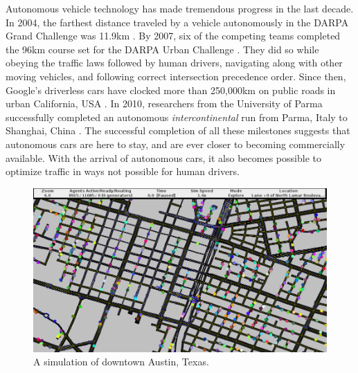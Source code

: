 \documentclass[letterpaper, 10 pt, conference]{ieeeconf}  %
\begin{document}
Autonomous vehicle technology has made tremendous progress in the last decade.
In 2004, the farthest distance traveled by a vehicle autonomously in the DARPA
Grand Challenge was 11.9km \cite{cnnGrandChallenge2004}. By 2007, six of the
competing teams completed the 96km course set for the DARPA Urban Challenge
\cite{spectrumUrbanChallenge2007}. They did so while obeying the traffic laws
followed by human drivers, navigating along with other moving vehicles, and
following correct intersection precedence order. Since then, Google's driverless
cars have clocked more than 250,000km on public roads in urban California, USA
\cite{tedThrun2011}. In 2010, researchers from the University of Parma
successfully completed an autonomous \textit{intercontinental} run from Parma,
Italy to Shanghai, China \cite{cnnVislab2010}. The successful completion of all
these milestones suggests that autonomous cars are here to stay, and are ever
closer to becoming commercially available. With the arrival of autonomous cars,
it also becomes possible to optimize traffic in ways not possible for human
drivers. 


\begin{figure}[t]
  \centering \includegraphics[width=\linewidth]{downtown_atx.png}
  \caption{A simulation of downtown Austin, Texas.}
  \label{fig:ui_screenshot}
  \vspace{-15pt}
\end{figure}
\end{document}
